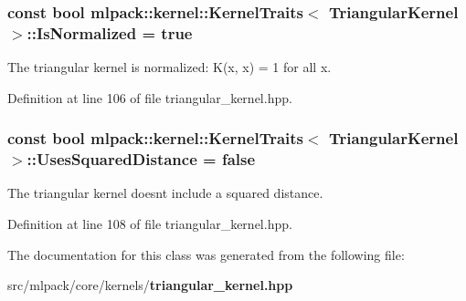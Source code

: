 \subsubsection[{Is\+Normalized}]{\setlength{\rightskip}{0pt plus 5cm}const bool {\bf mlpack\+::kernel\+::\+Kernel\+Traits}$<$ {\bf Triangular\+Kernel} $>$\+::Is\+Normalized = true\hspace{0.3cm}{\ttfamily [static]}}\label{classmlpack_1_1kernel_1_1KernelTraits_3_01TriangularKernel_01_4_a443782152a0f1637fef710d41b84414f}


The triangular kernel is normalized\+: K(x, x) = 1 for all x. 



Definition at line 106 of file triangular\+\_\+kernel.\+hpp.

\subsubsection[{Uses\+Squared\+Distance}]{\setlength{\rightskip}{0pt plus 5cm}const bool {\bf mlpack\+::kernel\+::\+Kernel\+Traits}$<$ {\bf Triangular\+Kernel} $>$\+::Uses\+Squared\+Distance = false\hspace{0.3cm}{\ttfamily [static]}}\label{classmlpack_1_1kernel_1_1KernelTraits_3_01TriangularKernel_01_4_a87e4ff5300e761844d221a52b33d1868}


The triangular kernel doesn\textquotesingle{}t include a squared distance. 



Definition at line 108 of file triangular\+\_\+kernel.\+hpp.



The documentation for this class was generated from the following file\+:\begin{DoxyCompactItemize}
\item 
src/mlpack/core/kernels/{\bf triangular\+\_\+kernel.\+hpp}\end{DoxyCompactItemize}

